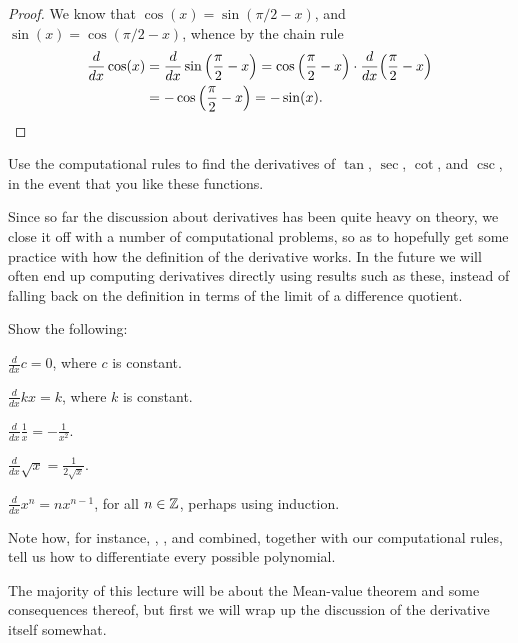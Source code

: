 \begin{proof}
	We know that $\cos(x) = \sin(\pi/2 - x)$, and $\sin(x) = \cos(\pi/2 - x)$, whence by the chain rule
	\begin{align*}
		\frac{d}{d x} \cos(x) & = \frac{d}{d x} \sin\Big ( \frac{\pi}{2} - x \Big ) = \cos \Big ( \frac{\pi}{2} - x \Big ) \cdot \frac{d}{d x} \Big ( \frac{\pi}{2} - x \Big ) \\
		                      & = - \cos \Big ( \frac{\pi}{2} - x \Big ) = - \sin(x). \qedhere
	\end{align*}
\end{proof}

\begin{exercise}
	Use the computational rules to find the derivatives of $\tan$, $\sec$, $\cot$, and $\csc$, in the event that you like these functions.
\end{exercise}

\noindent
Since so far the discussion about derivatives has been quite heavy on theory, we close it off with a number of computational problems, so as to hopefully get some practice with how the definition of the derivative works. In the future we will often end up computing derivatives directly using results such as these, instead of falling back on the definition in terms of the limit of a difference quotient.

\begin{exercises}
Show the following:
\begin{alphalist}
	\item $\displaystyle \frac{d}{d x} c = 0$, where $c$ is constant.
	\item $\displaystyle \frac{d}{d x} k x = k$, where $k$ is constant.
	\item $\displaystyle \frac{d}{d x} \frac{1}{x} = - \frac{1}{x^2}$.
	\item $\displaystyle \frac{d}{d x} \sqrt{x} = \frac{1}{2 \sqrt{x}}$.
	\item $\displaystyle \frac{d}{d x} x^n = n x^{n - 1}$, for all $n \in \mathbb{Z}$, perhaps using induction.
\end{alphalist}
\end{exercises}

\noindent
Note how, for instance, , , and  combined, together with our computational rules, tell us how to differentiate every possible polynomial.

The majority of this lecture will be about the Mean-value theorem and some consequences thereof, but first we will wrap up the discussion of the derivative itself somewhat.

